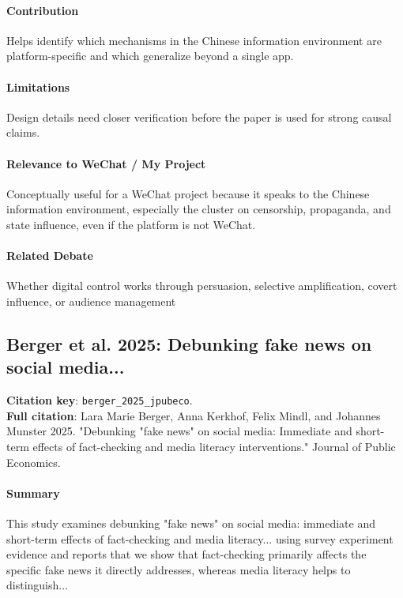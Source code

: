 \documentclass[12pt]{article}
\begin{document}
\paragraph{Contribution} Helps identify which mechanisms in the Chinese information environment are platform-specific and which generalize beyond a single app.

\paragraph{Limitations} Design details need closer verification before the paper is used for strong causal claims.

\paragraph{Relevance to WeChat / My Project} Conceptually useful for a WeChat project because it speaks to the Chinese information environment, especially the cluster on censorship, propaganda, and state influence, even if the platform is not WeChat.

\paragraph{Related Debate} Whether digital control works through persuasion, selective amplification, covert influence, or audience management


\subsection{Berger et al. 2025: Debunking fake news on social media...}
\textbf{Citation key}: \texttt{berger\_2025\_jpubeco}.\\
\textbf{Full citation}: Lara Marie Berger, Anna Kerkhof, Felix Mindl, and Johannes Munster 2025. "Debunking "fake news" on social media: Immediate and short-term effects of fact-checking and media literacy interventions." Journal of Public Economics.

\paragraph{Summary} This study examines debunking "fake news" on social media: immediate and short-term effects of fact-checking and media literacy... using survey experiment evidence and reports that we show that fact-checking primarily affects the specific fake news it directly addresses, whereas media literacy helps to distinguish...
\end{document}
